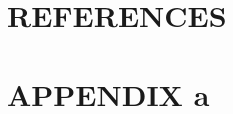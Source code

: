 \documentclass[letterpaper,11pt,2p]{elsarticle}
\begin{document}
\newpage 

\section{REFERENCES}
\label{subsec1}


\newpage 


\section{APPENDIX a}
\label{subsec1}












% 
% 
% 
% 
% 
% 
% 
% 
% 
% 
% 
% 
% 

%
\end{document}
